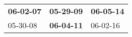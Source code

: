 \begin{supertabular}{p{0.33\columnwidth}p{0.33\columnwidth}p{0.33\columnwidth}}
 \textbf{06-02-07\textsuperscript{}} &  \textbf{05-29-09\textsuperscript{}} &  \textbf{06-05-14\textsuperscript{}} \\
          05-30-08\textsuperscript{} &  \textbf{06-04-11\textsuperscript{}} &           06-02-16\textsuperscript{} \\
\end{supertabular}
